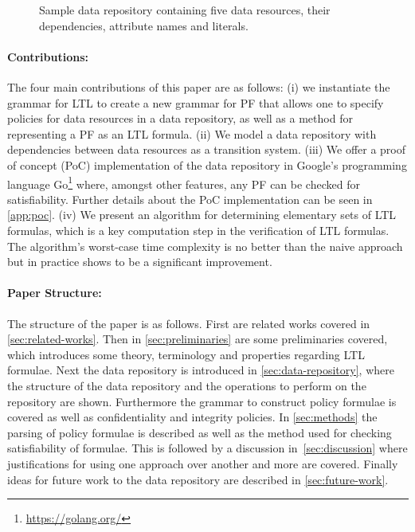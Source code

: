 \begin{figure}[!ht] 
    \begin{center}
        
        \caption{Sample data repository containing five data resources, their dependencies, attribute names and literals.}
        \label{fig:intro}
    \end{center}
\end{figure}

\paragraph{Contributions:} The four main contributions of this paper are as follows: (i) we instantiate the grammar for LTL to create a new grammar for PF that allows one to specify policies for data resources in a data repository, as well as a method for representing a PF as an LTL formula. (ii) We model a data repository with dependencies between data resources as a transition system. (iii) We offer a proof of concept (PoC) implementation of the data repository in Google's programming language Go\footnote{\href{https://golang.org/}{https://golang.org/}} where, amongst other features, any PF can be checked for satisfiability. Further details about the PoC implementation can be seen in \autoref{app:poc}. (iv) We present an algorithm for determining elementary sets of LTL formulas, which is a key computation step in the verification of LTL formulas. The algorithm's worst-case time complexity is no better than the naive approach but in practice shows to be a significant improvement.

\paragraph{Paper Structure:}
The structure of the paper is as follows. First are related works covered in \autoref{sec:related-works}. Then in \autoref{sec:preliminaries} are some preliminaries covered, which introduces some theory, terminology and properties regarding LTL formulae. Next the data repository is introduced in \autoref{sec:data-repository}, where the structure of the data repository and the operations to perform on the repository are shown. Furthermore the grammar to construct policy formulae is covered as well as confidentiality and integrity policies. In \autoref{sec:methods} the parsing of policy formulae is described as well as the method used for checking satisfiability of formulae. This is followed by a discussion in~\autoref{sec:discussion} where justifications for using one approach over another and more are covered. Finally ideas for future work to the data repository are described in \autoref{sec:future-work}.